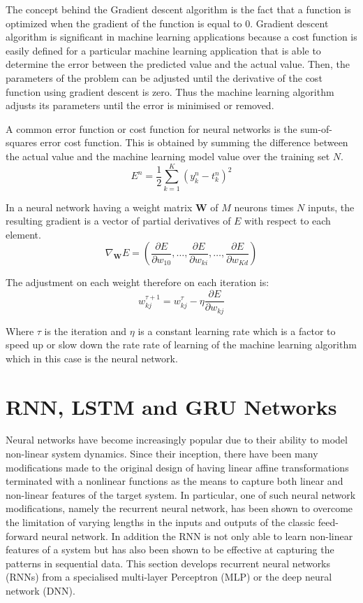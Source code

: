 The concept behind the Gradient descent algorithm is the fact that a function is optimized when the gradient of the function is equal to $0$.  Gradient descent algorithm is significant in machine learning applications because a cost function is easily defined for a particular machine learning application that is able to determine the error between the predicted value and the actual value.  Then, the parameters of the problem can be adjusted until the derivative of the cost function using gradient descent is zero.  Thus the machine learning algorithm adjusts its parameters until the error is minimised or removed.

A common error function or cost function for neural networks is the sum-of-squares error cost function.  This is obtained by summing the difference between the actual value and the machine learning model value over the training set $N$. 
\begin{equation}
E^n=\frac{1}{2}\sum_{k=1}^K(y_k^n-t_k^n)^2
\label{eqn_c3_nn_01}\end{equation}

In a neural network having a weight matrix $\mathbf{W}$ of $M$ neurons times $N$ inputs, the resulting gradient is a vector of partial derivatives of $E$ with respect to each element.  
\begin{equation}\nabla_{\mathbf{W}}E=\left(\frac{\partial E}{\partial w_{10}},\dots,\frac{\partial E}{\partial w_{ki}},\dots,\frac{\partial E}{\partial w_{Kd}}\right) 
\label{eqn_c3_nn_01}\end{equation}

The adjustment on each weight therefore on each iteration is:
\begin{equation}
w_{kj}^{\tau+1}=w_{kj}^{\tau}-\eta\frac{\partial E}{\partial w_{kj}}
\label{eqn_c3_nn_01}\end{equation}

Where $\tau$ is the iteration and $\eta$ is a constant learning rate which is a factor to speed up or slow down the rate rate of learning of the machine learning algorithm which in this case is the neural network.

\section{RNN, LSTM and GRU Networks}
Neural networks have become increasingly popular due to their ability to model non-linear system dynamics. Since their inception, there have been many modifications made to the original design of having linear affine transformations terminated with a nonlinear functions as the means to capture both linear and non-linear features of the target system. In particular, one of such neural network  modifications, namely the recurrent neural network, has been shown to overcome the limitation of varying lengths in the inputs and outputs of the classic feed-forward neural network.  In addition the RNN is not only able to learn non-linear features of a system but has also been shown to be effective at capturing the patterns in sequential data.  This section develops recurrent neural networks (RNNs) from a specialised multi-layer Perceptron (MLP) or the deep neural network (DNN).

